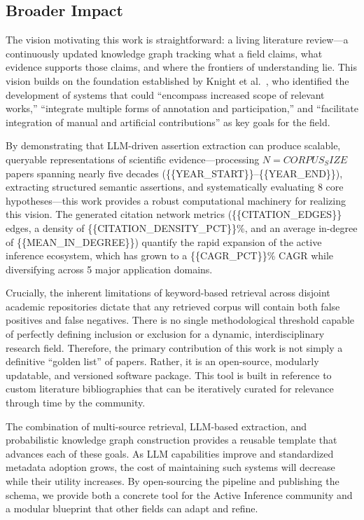 \documentclass[
]{article}
\begin{document}
\subsection{Broader Impact}\label{broader-impact}

The vision motivating this work is straightforward: a living literature
review---a continuously updated knowledge graph tracking what a field
claims, what evidence supports those claims, and where the frontiers of
understanding lie. This vision builds on the foundation established by
Knight et al.~\citep{knight2022fep}, who identified the development of
systems that could ``encompass increased scope of relevant works,''
``integrate multiple forms of annotation and participation,'' and
``facilitate integration of manual and artificial contributions'' as key
goals for the field.

By demonstrating that LLM-driven assertion extraction can produce
scalable, queryable representations of scientific evidence---processing
\(N = {{CORPUS_SIZE}}\) papers spanning nearly five decades
(\{\{YEAR\_START\}\}--\{\{YEAR\_END\}\}), extracting structured semantic
assertions, and systematically evaluating 8 core hypotheses---this work
provides a robust computational machinery for realizing this vision. The
generated citation network metrics (\{\{CITATION\_EDGES\}\} edges, a
density of \{\{CITATION\_DENSITY\_PCT\}\}\%, and an average in-degree of
\{\{MEAN\_IN\_DEGREE\}\}) quantify the rapid expansion of the active
inference ecosystem, which has grown to a \{\{CAGR\_PCT\}\}\% CAGR while
diversifying across 5 major application domains.

Crucially, the inherent limitations of keyword-based retrieval across
disjoint academic repositories dictate that any retrieved corpus will
contain both false positives and false negatives. There is no single
methodological threshold capable of perfectly defining inclusion or
exclusion for a dynamic, interdisciplinary research field. Therefore,
the primary contribution of this work is not simply a definitive
``golden list'' of papers. Rather, it is an open-source, modularly
updatable, and versioned software package. This tool is built in
reference to custom literature bibliographies that can be iteratively
curated for relevance through time by the community.

The combination of multi-source retrieval, LLM-based extraction, and
probabilistic knowledge graph construction provides a reusable template
that advances each of these goals. As LLM capabilities improve and
standardized metadata adoption grows, the cost of maintaining such
systems will decrease while their utility increases. By open-sourcing
the pipeline and publishing the schema, we provide both a concrete tool
for the Active Inference community and a modular blueprint that other
fields can adapt and refine.
\end{document}
